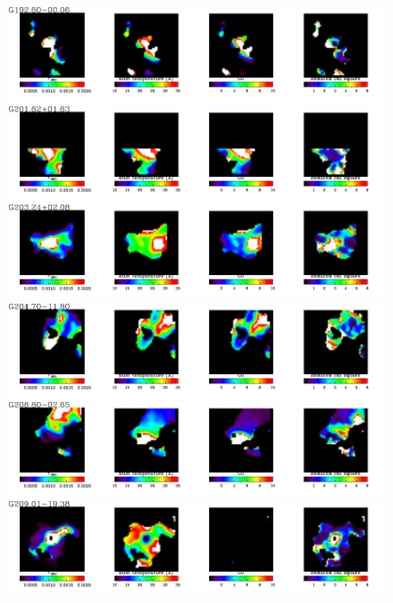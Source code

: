   \begin{figure}
\centering
\includegraphics[trim=0 2mm 0 0, clip, width=190mm]{appA/appA_48.pdf}
\includegraphics[trim=0 2mm 0 0, clip, width=190mm]{appA/appA_49.pdf}
\includegraphics[trim=0 2mm 0 0, clip, width=190mm]{appA/appA_50.pdf}
\includegraphics[trim=0 2mm 0 0, clip, width=190mm]{appA/appA_51.pdf}
\includegraphics[trim=0 2mm 0 0, clip, width=190mm]{appA/appA_52.pdf}
\includegraphics[trim=0 2mm 0 0, clip, width=190mm]{appA/appA_53.pdf}
  \end{figure}
  
